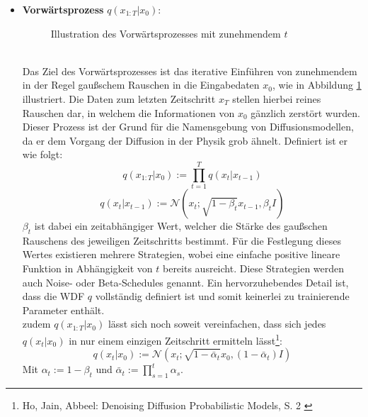 \begin{itemize}
    \item \textbf{Vorwärtsprozess} $q(x_{1:T}|x_0)$: \\
    \begin{figure}[htbp]
        \centering
        \caption{Illustration des Vorwärtsprozesses mit zunehmendem $t$}
        \label{fig:forward_process}
    \end{figure} \\
    Das Ziel des Vorwärtsprozesses ist das iterative Einführen von zunehmendem in der Regel gaußschem Rauschen in die Eingabedaten $x_0$, wie in Abbildung \ref{fig:forward_process} illustriert. Die Daten zum letzten Zeitschritt $x_T$ stellen hierbei reines Rauschen dar, in welchem die Informationen von $x_0$ gänzlich zerstört wurden. Dieser Prozess ist der Grund für die Namensgebung von Diffusionsmodellen, da er dem Vorgang der Diffusion in der Physik grob ähnelt. Definiert ist er wie folgt:
    \begin{equation}
        q(x_{1:T}|x_0) := \prod_{t=1}^T q(x_t | x_{t-1}) 
    \end{equation}
    \begin{equation}
        q(x_t|x_{t-1}) :=  \mathcal N(x_t; \sqrt{1-\beta_t}x_{t-1}, \beta_t I)
    \end{equation}
    $\beta_t$ ist dabei ein zeitabhängiger Wert, welcher die Stärke des gaußschen Rauschens des jeweiligen Zeitschritts bestimmt. Für die Festlegung dieses Wertes existieren mehrere Strategien, wobei eine einfache positive lineare Funktion in Abhängigkeit von $t$ bereits ausreicht. Diese Strategien werden auch Noise- oder Beta-Schedules genannt. Ein hervorzuhebendes Detail ist, dass die \ac{WDF} $q$ vollständig definiert ist und somit keinerlei zu trainierende Parameter enthält. \\
    zudem $q(x_{1:T}|x_0)$ lässt sich noch soweit vereinfachen, dass sich jedes $q(x_t|x_0)$ in nur einem einzigen Zeitschritt ermitteln lässt\footnote{
        Ho, Jain, Abbeel: Denoising Diffusion Probabilistic Models, S. 2
        \cite{ho2020denoisingdiffusionprobabilisticmodels}
    }:
    \begin{equation}
        q(x_t|x_0) :=  
        \mathcal N(x_t; \sqrt{1-\bar\alpha_t}x_0, (1 - \bar \alpha_t) I)
    \end{equation}
    Mit $\alpha_t := 1 - \beta_t$ und $\bar\alpha_t := \prod_{s=1}^t \alpha_s$.


\end{itemize}
